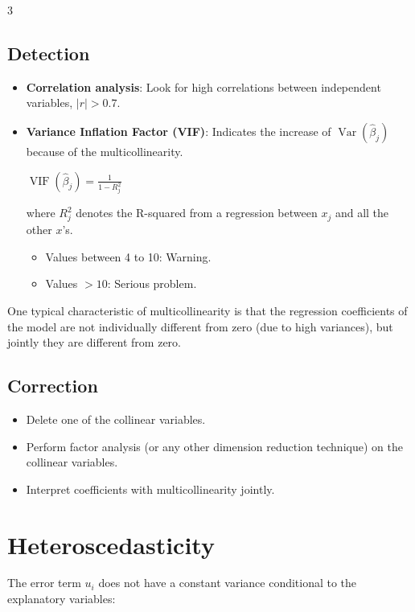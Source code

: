 \documentclass[10pt, a4paper, landscape]{article}
\DeclareMathOperator{\Var}{Var}
\begin{document}
\begin{multicols}{3}
\subsection*{Detection}

\begin{itemize}[leftmargin=*]
	\item \textbf{Correlation analysis}: Look for high correlations between independent variables, \( \lvert r \rvert > 0.7 \).
	\item \textbf{Variance Inflation Factor (VIF)}: Indicates the increase of \( \Var(\hat{\beta}_{j}) \) because of the multicollinearity.
	\begin{center}
		\( \operatorname{VIF}(\hat{\beta}_{j}) = \frac{1}{1 - R_{j}^{2}} \)
	\end{center}
	where \( R_{j}^{2} \) denotes the R-squared from a regression between \( x_{j} \) and all the other \( x \)'s.
	\begin{itemize}[leftmargin=*]
		\item Values between 4 to 10: Warning.
		\item Values \( > 10 \): Serious problem.
	\end{itemize}
\end{itemize}

One typical characteristic of multicollinearity is that the regression coefficients of the model are not individually different from zero (due to high variances), but jointly they are different from zero.

\subsection*{Correction}

\begin{itemize}[leftmargin=*]
	\item Delete one of the collinear variables.
	\item Perform factor analysis (or any other dimension reduction technique) on the collinear variables.
	\item Interpret coefficients with multicollinearity jointly.
\end{itemize}

\columnbreak

\section*{Heteroscedasticity}

The error term \( u_{i} \) does not have a constant variance conditional to the explanatory variables:


\end{multicols}
\end{document}
